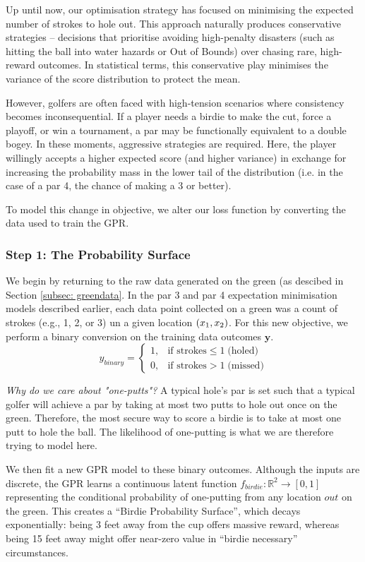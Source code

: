 \documentclass[11pt, letterpaper]{article}
\begin{document}
Up until now, our optimisation strategy has focused on minimising the expected number of strokes to hole out. This approach naturally produces conservative strategies – decisions that prioritise avoiding high-penalty disasters (such as hitting the ball into water hazards or Out of Bounds) over chasing rare, high-reward outcomes. In statistical terms, this conservative play minimises the variance of the score distribution to protect the mean.

However, golfers are often faced with high-tension scenarios where consistency becomes inconsequential. If a player needs a birdie to make the cut, force a playoff, or win a tournament, a par may be functionally equivalent to a double bogey. In these moments, aggressive strategies are required. Here, the player willingly accepts a higher expected score (and higher variance) in exchange for increasing the probability mass in the lower tail of the distribution (i.e. in the case of a par 4, the chance of making a 3 or better).

To model this change in objective, we alter our loss function by converting the data used to train the GPR.

\subsubsection{Step 1: The Probability Surface}
We begin by returning to the raw data generated on the green (as descibed in Section \ref{subsec: greendata}. In the par 3 and par 4 expectation minimisation models described earlier, each data point collected on a green was a count of strokes (e.g., 1, 2, or 3) un a given location $(x_1, x_2)$. For this new objective, we perform a binary conversion on the training data outcomes $\mathbf{y}$. 
\[y_{binary} = \begin{cases}
1, & \text{if strokes} \le 1 \;\text{(holed)} \\
0, & \text{if strokes} > 1 \;\text{(missed)}
\end{cases}\]

\textit{Why do we care about "one-putts"?} A typical hole's par is set such that a typical golfer will achieve a par by taking at most two putts to hole out once on the green. Therefore, the most secure way to score a birdie is to take at most one putt to hole the ball. The likelihood of one-putting is what we are therefore trying to model here.

We then fit a new GPR model to these binary outcomes. Although the inputs are discrete, the GPR learns a continuous latent function $f_{birdie}: \mathbb{R}^2 \to [0,1] $ representing the conditional probability of one-putting from any location $out$ on the green. This creates a ``Birdie Probability Surface'', which decays exponentially: being 3 feet away from the cup offers massive reward, whereas being 15 feet away might offer near-zero value in ``birdie necessary'' circumstances.
\end{document}
